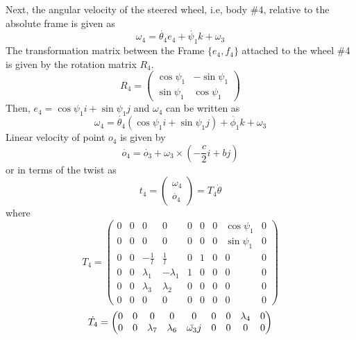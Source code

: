{Next,  the angular velocity of the steered wheel, i.e, body \#4, relative to the absolute frame is given as 
\[\omega_4=\dot{\theta_4}e_4+ \dot{\psi_1} k +\omega_3\]
The transformation matrix between the Frame $\{e_4,f_4\}$ attached to the wheel \#4 is given by the rotation matrix $R_4$. 
\begin{equation}
\label{eqn:slipR4}
R_4=\begin{pmatrix}
\cos \psi_1 & - \sin \psi_1\\
\sin \psi_1 & \cos\psi_1
\end{pmatrix}
\end{equation}
Then, $e_4= \cos\psi_1 i +\sin \psi_1 j$  and $\omega_4$ can be written as 
\[ \omega_4= \dot{\theta_4}( \cos\psi_1 i +\sin \psi_1 j)+ \dot{\phi_1} k +\omega_3 \]
Linear velocity of point $o_4$ is given by
\[ \dot{o_4}=\dot{o_3}+\omega_3 \times (-\frac{c}{2}i+bj) \]
or in terms of the twist as
\begin{equation}
\label{eqn:slip_t4}
t_4=
\begin{pmatrix}
\omega_4\\
\dot{o_4}
\end{pmatrix}=T_4 \dot{\theta}
\end{equation}
where 
\begin{equation}
\label{eqn:slip_T4}
T_4=\left(
\begin{array}{ccccccccc}
0 & 0 & 0 & 0 & 0 & 0 & 0 & \cos\psi_1 & 0 \\
0 & 0 & 0 & 0 & 0 & 0 & 0 & \sin\psi_1 & 0 \\
0 & 0 & -\frac{1}{l} & \frac{1}{l} & 0 & 1 & 0 & 0 & 0 \\
0 & 0 & \lambda_1 & -\lambda_1 & 1 & 0 & 0 & 0 & 0 \\
0 & 0 &\lambda_3 & \lambda_2 & 0 & 0 & 0 & 0 & 0 \\
0 & 0 & 0 & 0 & 0 & 0 & 0 & 0 & 0
\end{array}
\right)
\end{equation}
\begin{equation}
\label{eqn{:slip_dT4}}
\dot{T_4}=\begin{pmatrix}
0 & 0 & 0 & 0 & 0 & 0 & 0 & \lambda_4 & 0\\
0 & 0 & \lambda_7 & \lambda_6 & \bar{\omega_3}j & 0 & 0 & 0 & 0
\end{pmatrix}
\end{equation}

}
